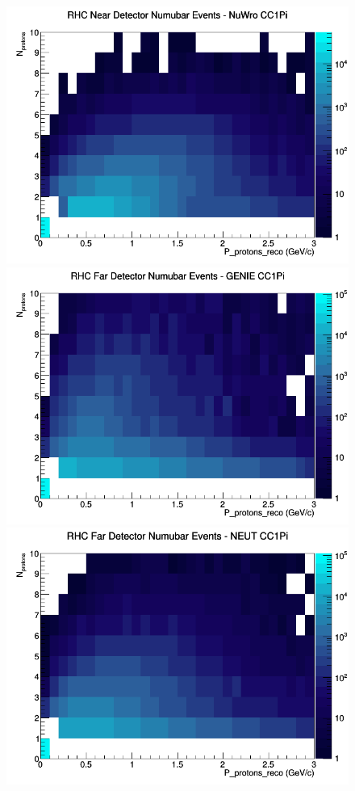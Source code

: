\begin{figure}[h]
\includegraphics[width=\linewidth]{eff_N_P/FGT/protons/CC1Pi_RHC_ND_numubar_N_P_NuWro.png}
\endminipage
\newline
{}
\includegraphics[width=\linewidth]{eff_N_P/FGT/protons/CC1Pi_RHC_FD_numubar_N_P_GENIE.png}
\endminipage
{}
\includegraphics[width=\linewidth]{eff_N_P/FGT/protons/CC1Pi_RHC_FD_numubar_N_P_NEUT.png}

\end{figure}
